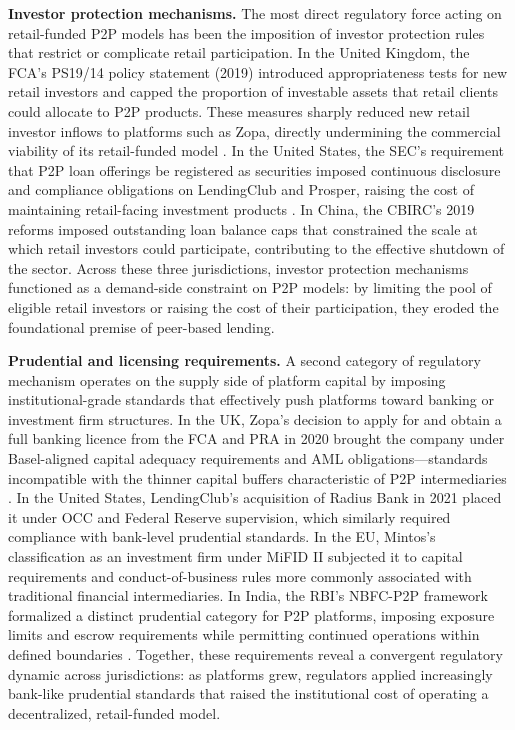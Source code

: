 \documentclass[pdflatex,sn-apa]{sn-jnl}%
\theoremstyle{thmstyleone}%
\theoremstyle{thmstyletwo}%
\theoremstyle{thmstylethree}%
\begin{document}
\textcolor{NavyBlue}{\textbf{Investor protection mechanisms.} The most direct regulatory force acting on retail-funded P2P models has been the imposition of investor protection rules that restrict or complicate retail participation. In the United Kingdom, the FCA's PS19/14 policy statement (2019) introduced appropriateness tests for new retail investors and capped the proportion of investable assets that retail clients could allocate to P2P products. These measures sharply reduced new retail investor inflows to platforms such as Zopa, directly undermining the commercial viability of its retail-funded model \citep{fca_ps1914_2018}. In the United States, the SEC's requirement that P2P loan offerings be registered as securities imposed continuous disclosure and compliance obligations on LendingClub and Prosper, raising the cost of maintaining retail-facing investment products \citep{us_securities_and_exchange_commission_secgov_nodate}. In China, the CBIRC's 2019 reforms imposed outstanding loan balance caps that constrained the scale at which retail investors could participate, contributing to the effective shutdown of the sector. Across these three jurisdictions, investor protection mechanisms functioned as a demand-side constraint on P2P models: by limiting the pool of eligible retail investors or raising the cost of their participation, they eroded the foundational premise of peer-based lending.}

\textcolor{NavyBlue}{\textbf{Prudential and licensing requirements.} A second category of regulatory mechanism operates on the supply side of platform capital by imposing institutional-grade standards that effectively push platforms toward banking or investment firm structures. In the UK, Zopa's decision to apply for and obtain a full banking licence from the FCA and PRA in 2020 brought the company under Basel-aligned capital adequacy requirements and AML obligations—standards incompatible with the thinner capital buffers characteristic of P2P intermediaries \citep{zopa_bank_limited_about_nodate}. In the United States, LendingClub's acquisition of Radius Bank in 2021 placed it under OCC and Federal Reserve supervision, which similarly required compliance with bank-level prudential standards. In the EU, Mintos's classification as an investment firm under MiFID II subjected it to capital requirements and conduct-of-business rules more commonly associated with traditional financial intermediaries. In India, the RBI's NBFC-P2P framework formalized a distinct prudential category for P2P platforms, imposing exposure limits and escrow requirements while permitting continued operations within defined boundaries \citep{rbi_non-banking_2017}. Together, these requirements reveal a convergent regulatory dynamic across jurisdictions: as platforms grew, regulators applied increasingly bank-like prudential standards that raised the institutional cost of operating a decentralized, retail-funded model.}
\end{document}
